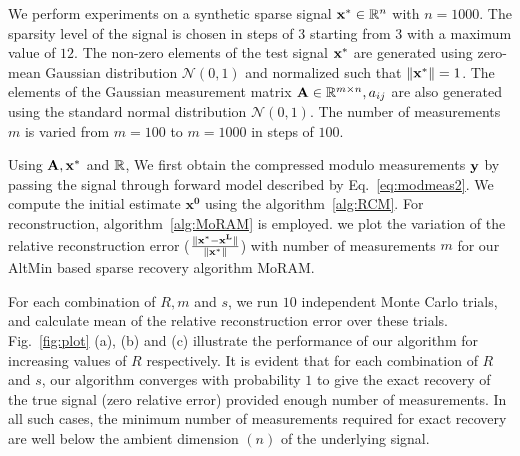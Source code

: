 We perform experiments on a synthetic sparse signal $\mathbf{x^*} \in {\mathbb{R}}^n$ with $n=1000$. The sparsity level of the signal is chosen in steps of $3$ starting from $3$ with a maximum value of $12$. The non-zero elements of the test signal $\mathbf{x^*}$ are generated using zero-mean Gaussian distribution $\mathcal{N}(0, 1)$ and normalized such that $\|\mathbf{x^*}\| =1$. The elements of the Gaussian measurement matrix $\mathbf{A} \in {\mathbb{R}}^{m\times n}, a_{ij}$ are also generated using the standard normal distribution $\mathcal{N}(0, 1)$. The number of measurements $m$ is varied from $m = 100$ to $m=1000$ in steps of $100$.  



Using $\mathbf{A, x^*}$ and ${\mathbb{R}}$, We first obtain the compressed modulo measurements $\mathbf{y}$ by passing the signal through forward model described by Eq.~\ref{eq:modmeas2}. We compute the initial estimate $\mathbf{x^0}$ using the algorithm~\ref{alg:RCM}. For reconstruction, algorithm~\ref{alg:MoRAM} is employed. we plot the variation of the relative reconstruction error ($\frac{\|\mathbf{x^*-x^L}\|}{\|\mathbf{x^*}\|}$) with number of measurements $m$ for our AltMin based sparse recovery algorithm MoRAM.

For each combination of $R, m$ and $s$, we run $10$ independent Monte Carlo trials, and calculate mean of the relative reconstruction error over these trials. Fig.~\ref{fig:plot} (a), (b) and (c) illustrate the performance of our algorithm for increasing values of $R$ respectively. It is evident that for each combination of $R$ and $s$, our algorithm converges with probability $1$ to give the exact recovery of the true signal (zero relative error) provided enough number of measurements. In all such cases, the minimum number of measurements required for exact recovery are well below the ambient dimension $(n)$ of the underlying signal. 

